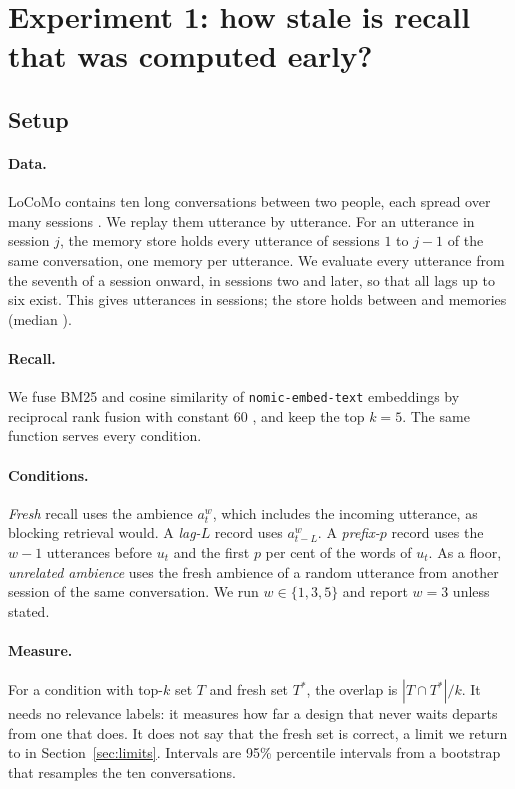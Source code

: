 \documentclass[10pt]{article}
\begin{document}
\section{Experiment 1: how stale is recall that was computed early?}
\label{sec:e1}

\subsection{Setup}

\paragraph{Data.} LoCoMo contains ten long conversations between two people, each spread over many sessions \citep{maharana2024locomo}. We replay them utterance by utterance. For an utterance in session $j$, the memory store holds every utterance of sessions $1$ to $j-1$ of the same conversation, one memory per utterance. We evaluate every utterance from the seventh of a session onward, in sessions two and later, so that all lags up to six exist. This gives \EoneTurns{} utterances in \EoneSessions{} sessions; the store holds between \EoneMemMin{} and \EoneMemMax{} memories (median \EoneMemMedian{}).

\paragraph{Recall.} We fuse BM25 \citep{robertson2009bm25} and cosine similarity of \texttt{nomic-embed-text} embeddings \citep{nussbaum2024nomic} by reciprocal rank fusion with constant 60 \citep{cormack2009rrf}, and keep the top $k=5$. The same function serves every condition.

\paragraph{Conditions.} \emph{Fresh} recall uses the ambience $a^{w}_{t}$, which includes the incoming utterance, as blocking retrieval would. A \emph{lag-$L$} record uses $a^{w}_{t-L}$. A \emph{prefix-$p$} record uses the $w-1$ utterances before $u_t$ and the first $p$ per cent of the words of $u_t$. As a floor, \emph{unrelated ambience} uses the fresh ambience of a random utterance from another session of the same conversation. We run $w \in \{1, 3, 5\}$ and report $w=3$ unless stated.

\paragraph{Measure.} For a condition with top-$k$ set $T$ and fresh set $T^{*}$, the overlap is $|T \cap T^{*}|/k$. It needs no relevance labels: it measures how far a design that never waits departs from one that does. It does not say that the fresh set is correct, a limit we return to in Section~\ref{sec:limits}. Intervals are 95\% percentile intervals from a bootstrap \citep{efron1979bootstrap} that resamples the ten conversations.
\end{document}
